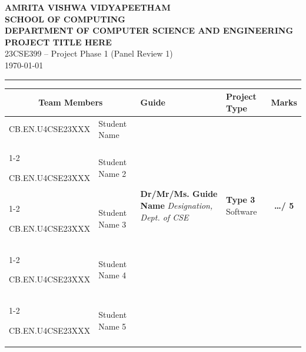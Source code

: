 \documentclass[11pt, a4paper]{article}
\begin{document}
\noindent
\begin{minipage}{\textwidth}
    \centering
    {\Large \textbf{\textcolor{amritaMaroon}{
    AMRITA VISHWA VIDYAPEETHAM \\
    SCHOOL OF COMPUTING \\
    DEPARTMENT OF COMPUTER SCIENCE AND ENGINEERING \\
    }}} 
    \vspace{0.2cm}
    {\large \textbf{PROJECT TITLE HERE}} \\
    \vspace{0.1cm}
    23CSE399 -- Project Phase 1 (Panel Review 1)\\
    \today %
\end{minipage}

\vspace{0.3cm}
\hrule
\vspace{0.3cm}

\noindent
\begin{center}
    \renewcommand{\arraystretch}{1.5}
    \setlength{\tabcolsep}{5pt}
    \begin{tabular}{|l|p{4.2cm}|p{4cm}|p{2.5cm}|c|}
        \hline
        \multicolumn{2}{|c|}{\textbf{Team Members}} & \textbf{Guide} & \textbf{Project Type} & \textbf{Marks} \\ 
        \hline
        
        \small CB.EN.U4CSE23XXX & \small \raggedright Student Name & 
        \multirow{4}{=}{\raggedright \small \textbf{Dr/Mr/Ms. Guide Name} \newline \textit{Designation, \newline Dept. of CSE}} & 
        \multirow{4}{=}{\raggedright \small \textbf{Type 3} \newline Software} & 
        \multirow{4}{*}{\textbf{\huge \dots / 5}} \\ \cline{1-2}
        
        \small CB.EN.U4CSE23XXX & \small Student Name 2 & & & \\ \cline{1-2}
        
        \small CB.EN.U4CSE23XXX & \small Student Name 3 & & & \\ \cline{1-2}
        
        \small CB.EN.U4CSE23XXX & \small Student Name 4 & & & \\ 
        \cline{1-2}
        
        \small CB.EN.U4CSE23XXX & \small Student Name 5 & & & \\ 
        \hline
    \end{tabular}
\end{center}
\vspace{0.2cm}
\end{document}
